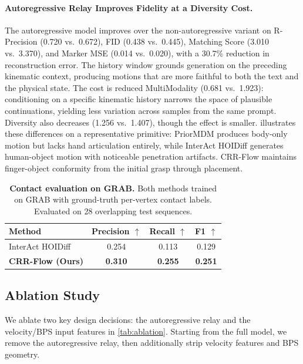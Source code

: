 \documentclass[sigconf, screen, review, anonymous]{acmart}
\begin{document}
\paragraph{Autoregressive Relay Improves Fidelity at a Diversity Cost.}
The autoregressive model improves over the non-autoregressive variant on R-Precision (0.720 vs.\ 0.672), FID (0.438 vs.\ 0.445), Matching Score (3.010 vs.\ 3.370), and Marker MSE (0.014 vs.\ 0.020), with a 30.7\% reduction in reconstruction error.
The history window grounds generation on the preceding kinematic context, producing motions that are more faithful to both the text and the physical state.
The cost is reduced MultiModality (0.681 vs.\ 1.923): conditioning on a specific kinematic history narrows the space of plausible continuations, yielding less variation across samples from the same prompt.
Diversity also decreases (1.256 vs.\ 1.407), though the effect is smaller.
 illustrates these differences on a representative primitive: PriorMDM produces body-only motion but lacks hand articulation entirely, while InterAct HOIDiff generates human-object motion with noticeable penetration artifacts.
CRR-Flow maintains finger-object conformity from the initial grasp through placement.

\begin{table}[t]
  \caption{\textbf{Contact evaluation on GRAB.} Both methods trained on GRAB with ground-truth per-vertex contact labels. Evaluated on 28 overlapping test sequences.}
  \label{tab:contact_eval}
  \centering
  \small
  \begin{tabular}{@{}lccc@{}}
    \toprule
    Method & Precision $\uparrow$ & Recall $\uparrow$ & F1 $\uparrow$ \\
    \midrule
    InterAct HOIDiff~\cite{xu2025interact} & 0.254 & 0.113 & 0.129 \\
    \textbf{CRR-Flow (Ours)} & \textbf{0.310} & \textbf{0.255} & \textbf{0.251} \\
    \bottomrule
  \end{tabular}
\end{table}


\subsection{Ablation Study}
\label{sec:ablation}

We ablate two key design decisions: the autoregressive relay and the velocity/BPS input features in \cref{tab:ablation}.
Starting from the full model, we remove the autoregressive relay, then additionally strip velocity features and BPS geometry.
\end{document}
